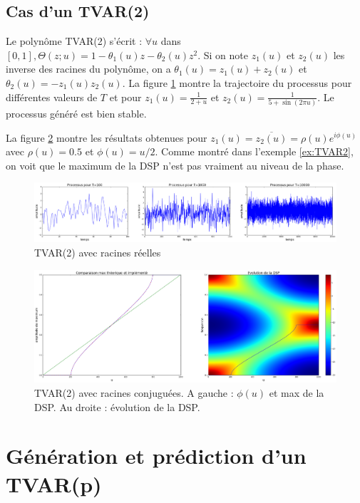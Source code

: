\documentclass{report}
\begin{document}
\subsection{Cas d'un TVAR(2)}
Le polynôme TVAR(2) s'écrit : $\forall u$ dans $[0,1], \Theta(z;u) = 1 - \theta_1(u) z - \theta_2(u) z^2$.
Si on note $z_1(u)$ et $z_2(u)$ les inverse des racines du polynôme, on a 
$\theta_1(u) = z_1(u) + z_2(u)$ et $\theta_2(u) = -z_1(u) z_2(u)$. La figure
\ref{fig:TVAR2_reelle} montre la trajectoire du processus pour différentes valeurs de $T$ et pour $z_1(u) = \frac{1}{2 + u}$ et $z_2(u) = \frac{1}{5 + \sin(2 \pi u)}$. Le processus généré est bien stable. 

La figure \ref{fig:TVAR2_conjuguees} montre les résultats obtenues pour $z_1(u) = \overline{z_2(u)}=\rho(u)e^{i\phi(u)}$ avec $\rho(u)=0.5$ et $\phi(u)=u/2$. Comme montré dans l'exemple \ref{ex:TVAR2}, on voit que le maximum de la DSP n'est pas vraiment au niveau de la phase. 

\begin{figure}[h]
\includegraphics[scale=0.3]{presentation/images/TVAR2_racines_reelles.png}
\caption{TVAR(2) avec racines réelles}
\label{fig:TVAR2_reelle}
\end{figure}

\begin{figure}[h!]
\includegraphics[scale=0.3]{presentation/images/TVAR2_racines_conjuguees.png}
\caption{TVAR(2) avec racines conjuguées. A gauche : $\phi(u)$ et max de la DSP. Au droite : évolution de la DSP.}
\label{fig:TVAR2_conjuguees}
\end{figure}
\pagebreak
\section{Génération et prédiction d'un TVAR(p)}
\end{document}
